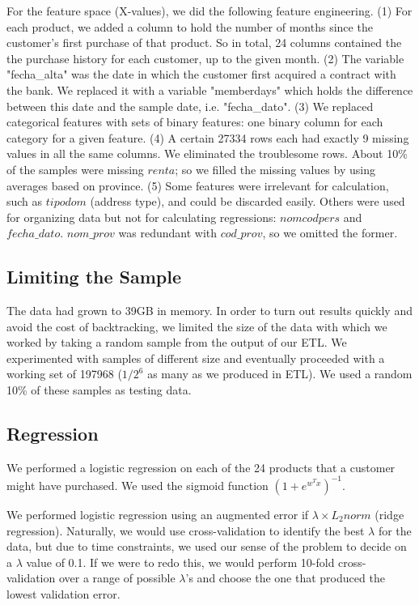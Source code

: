 \documentclass{article}
\begin{document}
\begin{spacing}{1}
\begin{large}
For the feature space (X-values), we did the following feature engineering. (1) For each product, we added a column to hold the number of months since the customer’s first purchase of that product. So in total, 24 columns contained the the purchase history for each customer, up to the given month. (2) The variable "fecha\_alta" was the date in which the customer first acquired a contract with the bank. We replaced it with a variable "memberdays" which holds the difference between this date and the sample date, i.e. "fecha\_dato". (3) We replaced categorical features with sets of binary features: one binary column for each category for a given feature. (4) A certain 27334 rows each had exactly 9 missing values in all the same columns. We eliminated the troublesome rows. About 10\% of the samples were missing $renta$; so we filled the missing values by using averages based on province. \cite{paper2} (5) Some features were irrelevant for calculation, such as $tipodom$ (address type), and could be discarded easily. Others were used for organizing data but not for calculating regressions: $nomcodpers$ and $fecha\_dato$. $nom\_prov$ was redundant with $cod\_prov$, so we omitted the former.
 
\subsection{Limiting the Sample}

The data had grown to 39GB in memory. In order to turn out results quickly and avoid the cost of backtracking, we limited the size of the data with which we worked by taking a random sample from the output of our ETL. We experimented with samples of different size and eventually proceeded with a working set of 197968 ($1/2^6$ as many as we produced in ETL). We used a random 10\% of these samples as testing data.

\subsection{Regression}

We performed a logistic regression on each of the 24 products that a customer might have purchased. We used the sigmoid function $(1+e^{w^Tx})^{-1}$.

We performed logistic regression using an augmented error if $\lambda \times L_2norm$ (ridge regression). Naturally, we would use cross-validation to identify the best $\lambda$ for the data, but due to time constraints, we used our sense of the problem to decide on a $\lambda$ value of 0.1. If we were to redo this, we would perform 10-fold cross-validation over a range of possible $\lambda$'s and choose the one that produced the lowest validation error.


\end{large}
\end{spacing}
\end{document}
